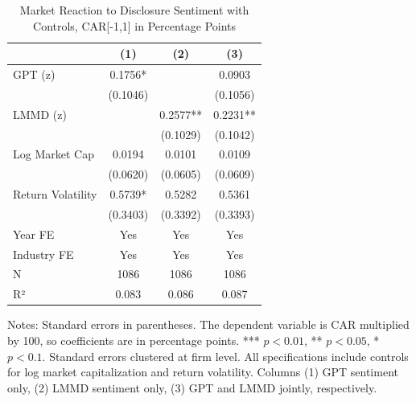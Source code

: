 \begin{table}[htbp]
\centering
\caption{Market Reaction to Disclosure Sentiment with Controls, CAR[-1,1] in Percentage Points}
\label{tab:car_sentiment_controls}
\begin{tabular}{lccc}
\toprule
 & (1) & (2) & (3) \\
\midrule
GPT (z) & 0.1756* &  & 0.0903 \\
  & (0.1046) &  & (0.1056) \\
LMMD (z) &  & 0.2577** & 0.2231** \\
  &  & (0.1029) & (0.1042) \\
Log Market Cap & 0.0194 & 0.0101 & 0.0109 \\
  & (0.0620) & (0.0605) & (0.0609) \\
Return Volatility & 0.5739* & 0.5282 & 0.5361 \\
  & (0.3403) & (0.3392) & (0.3393) \\
\midrule
Year FE & Yes & Yes & Yes \\
Industry FE & Yes & Yes & Yes \\
N & 1086 & 1086 & 1086 \\
R² & 0.083 & 0.086 & 0.087 \\
\bottomrule
\end{tabular}\begin{flushleft}
\footnotesize Notes: Standard errors in parentheses. The dependent variable is CAR multiplied by 100, so coefficients are in percentage points. *** $p<0.01$, ** $p<0.05$, * $p<0.1$. Standard errors clustered at firm level. All specifications include controls for log market capitalization and return volatility. Columns (1) GPT sentiment only, (2) LMMD sentiment only, (3) GPT and LMMD jointly, respectively.
\end{flushleft}
\end{table}